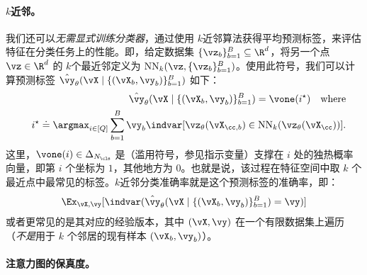 \documentclass[../../book-main_zh.tex]{subfiles}
\begin{document}
\paragraph{\(k\)近邻。} 我们还可以\textit{无需显式训练分类器}，通过使用 \(k\)近邻算法获得平均预测标签，来评估特征在分类任务上的性能。即，给定数据集 \(\{\vz_{b}\}_{b = 1}^{B} \subseteq \R^{d}\)，将另一个点 \(\vz \in \R^{d}\) 的 \(k\)个最近邻定义为 \(\operatorname{NN}_{k}(\vz, \{\vz_{b}\}_{b = 1}^{B})\)。使用此符号，我们可以计算预测标签 \(\hat{\vy}_{\theta}(\vX \mid \{(\vX_{b}, \vy_{b})\}_{b = 1}^{B})\) 如下：
\begin{eqnarray}
&&\hat{\vy}_{\theta}(\vX \mid \{(\vX_{b}, \vy_{b})\}_{b = 1}^{B}) =
\vone(i^{\star}) \quad \text{where} \nonumber \\
&& i^{\star} \doteq \argmax_{i \in [Q]}\sum_{b =
1}^{B}\vy_{b}\indvar[\vz_{\theta}(\vX_{\cc, b}) \in
\operatorname{NN}_{k}(\vz_{\theta}(\vX_{\cc}))].
\end{eqnarray}
这里，\(\vone(i) \in \Delta_{N_{\cls}}\) 是（滥用符号，参见指示变量）支撑在 \(i\) 处的独热概率向量，即第 \(i\) 个坐标为 \(1\)，其他地方为 \(0\)。也就是说，该过程在特征空间中取 \(k\) 个最近点中最常见的标签。\(k\)近邻分类准确率就是这个预测标签的准确率，即：
\begin{equation}
\Ex_{\vX, \vy}[\indvar(\hat{\vy}_{\theta}(\vX \mid \{(\vX_{b},
\vy_{b})\}_{b = 1}^{B}) = \vy)]
\end{equation}
或者更常见的是其对应的经验版本，其中 \((\vX, \vy)\) 在一个有限数据集上遍历（\textit{不是}用于 \(k\) 个邻居的现有样本 \((\vX_{b}, \vy_{b})\)）。

\paragraph{注意力图的保真度。}
\end{document}

